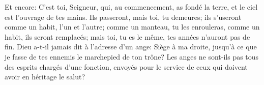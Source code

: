 Et encore: C’est toi, Seigneur, qui, au commencement, as fondé la terre,
	et le ciel est l’ouvrage de tes mains.
Ils passeront, mais toi, tu demeures;
	ils s’useront comme un habit, l’un et l’autre;
	comme un manteau, tu les enrouleras, comme un habit, ils seront remplacés;
	mais toi, tu es le même, tes années n’auront pas de fin.
Dieu a-t-il jamais dit à l’adresse d’un ange: Siège à ma droite,
	jusqu’à ce que je fasse de tes ennemis le marchepied de ton trône?
Les anges ne sont-ils pas tous des esprits chargés d’une fonction,
	envoyés pour le service de ceux qui doivent avoir en héritage le salut?
